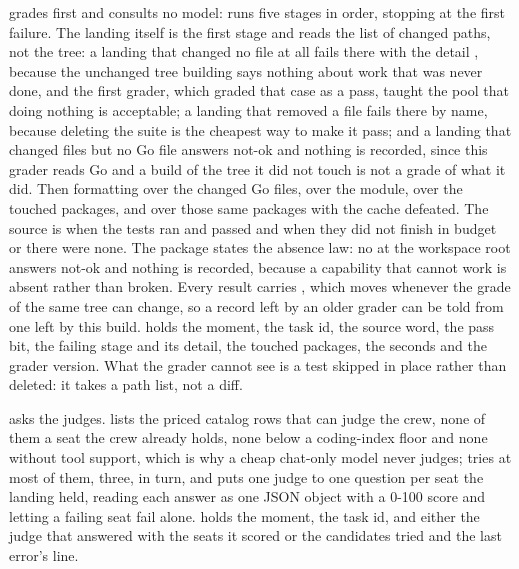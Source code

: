  grades first and consults no model: 
runs five stages in order, stopping at the first failure. The landing itself is
the first stage and reads the list of changed paths, not the tree: a landing
that changed no file at all fails there with the detail , because the unchanged tree building says nothing about
work that was never done, and the first grader, which graded that case as a
pass, taught the pool that doing nothing is acceptable; a landing that removed a
 file fails there by name, because deleting the suite is the
cheapest way to make it pass; and a landing that changed files but no Go file
answers not-ok and nothing is recorded, since this grader reads Go and a build
of the tree it did not touch is not a grade of what it did. Then formatting over
the changed Go files,  over the module,  over
the touched packages, and  over those same packages with
the cache defeated. The source is  when the tests ran and
passed and  when they did not finish in budget or there
were none. The package states the absence law: no  at the workspace
root answers not-ok and nothing is recorded, because a capability that cannot
work is absent rather than broken. Every result carries ,
which moves whenever the grade of the same tree can change, so a record left by
an older grader can be told from one left by this build.
 holds the moment, the task id, the source word, the pass
bit, the failing stage and its detail, the touched packages, the seconds and the
grader version. What the grader cannot see is a test skipped in place rather
than deleted: it takes a path list, not a diff.

 asks the judges.  lists the priced
catalog rows that can judge the crew, none of them a seat the crew already
holds, none below a coding-index floor and none without tool support, which is
why a cheap chat-only model never judges;  tries at most
 of them, three, in turn, and  puts one
judge to one question per seat the landing held, reading each answer as one JSON object with a 0-100 score
and letting a failing seat fail alone.  holds the
moment, the task id, and either the judge that answered with the seats it scored
or the candidates tried and the last error's line.

